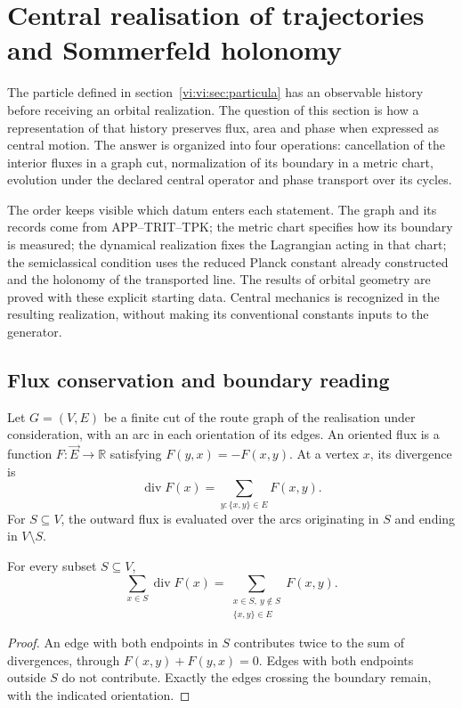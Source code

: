 \section{Central realisation of trajectories and Sommerfeld holonomy}
\label{vi:vi:sec:kepler}

The particle defined in section~\ref{vi:vi:sec:particula} has
an observable history before receiving an orbital realization.
The question of this section is how a representation of that
history preserves flux, area and phase when expressed as
central motion. The answer is organized into four operations:
cancellation of the interior fluxes in a graph cut,
normalization of its boundary in a metric chart, evolution under
the declared central operator and phase transport over its cycles.

The order keeps visible which datum enters each statement.
The graph and its records come from APP--TRIT--TPK; the metric
chart specifies how its boundary is measured; the dynamical realization
fixes the Lagrangian acting in that chart; the semiclassical condition
uses the reduced Planck constant already constructed and the holonomy
of the transported line. The results of orbital geometry are
proved with these explicit starting data. Central
mechanics is recognized in the resulting realization, without making its
conventional constants inputs to the generator.

\subsection{Flux conservation and boundary reading}
\label{vi:vi:subsec:gauss}

Let $G=(V,E)$ be a finite cut of the route graph of the
realisation under consideration, with an arc in each orientation of its
edges. An oriented flux is a function
$F:\vec E\to\mathbb R$ satisfying
$F(y,x)=-F(x,y)$. At a vertex $x$, its divergence is
\begin{equation}
 \operatorname{div}F(x)
 =\sum_{y:\{x,y\}\in E}F(x,y).
 \label{vi:vi:eq:divergencia-grafo}
\end{equation}
For $S\subseteq V$, the outward flux is evaluated over the
arcs originating in $S$ and ending in $V\setminus S$.

\begin{theorem}
\label{vi:vi:thm:gauss}
For every subset $S\subseteq V$,
\begin{equation}
 \sum_{x\in S}\operatorname{div}F(x)
 =\sum_{\substack{x\in S,\ y\notin S\\\{x,y\}\in E}}F(x,y).
 \label{vi:vi:eq:gauss}
\end{equation}
\end{theorem}
\begin{proof}
An edge with both endpoints in $S$ contributes twice to the
sum of divergences, through $F(x,y)+F(y,x)=0$. Edges
with both endpoints outside $S$ do not contribute. Exactly
the edges crossing the boundary remain, with the
indicated orientation.
\end{proof}

